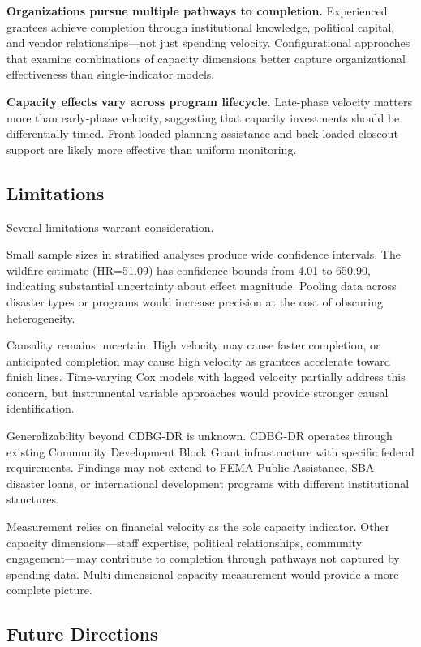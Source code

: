 \documentclass[
  12pt,
  letterpaper,
]{article}
\begin{document}
\textbf{Organizations pursue multiple pathways to completion.}
Experienced grantees achieve completion through institutional knowledge,
political capital, and vendor relationships---not just spending
velocity. Configurational approaches that examine combinations of
capacity dimensions better capture organizational effectiveness than
single-indicator models.

\textbf{Capacity effects vary across program lifecycle.} Late-phase
velocity matters more than early-phase velocity, suggesting that
capacity investments should be differentially timed. Front-loaded
planning assistance and back-loaded closeout support are likely more
effective than uniform monitoring.

\subsection{Limitations}\label{limitations}

Several limitations warrant consideration.

Small sample sizes in stratified analyses produce wide confidence
intervals. The wildfire estimate (HR=51.09) has confidence bounds from
4.01 to 650.90, indicating substantial uncertainty about effect
magnitude. Pooling data across disaster types or programs would increase
precision at the cost of obscuring heterogeneity.

Causality remains uncertain. High velocity may cause faster completion,
or anticipated completion may cause high velocity as grantees accelerate
toward finish lines. Time-varying Cox models with lagged velocity
partially address this concern, but instrumental variable approaches
would provide stronger causal identification.

Generalizability beyond CDBG-DR is unknown. CDBG-DR operates through
existing Community Development Block Grant infrastructure with specific
federal requirements. Findings may not extend to FEMA Public Assistance,
SBA disaster loans, or international development programs with different
institutional structures.

Measurement relies on financial velocity as the sole capacity indicator.
Other capacity dimensions---staff expertise, political relationships,
community engagement---may contribute to completion through pathways not
captured by spending data. Multi-dimensional capacity measurement would
provide a more complete picture.

\subsection{Future Directions}\label{future-directions}
\end{document}
